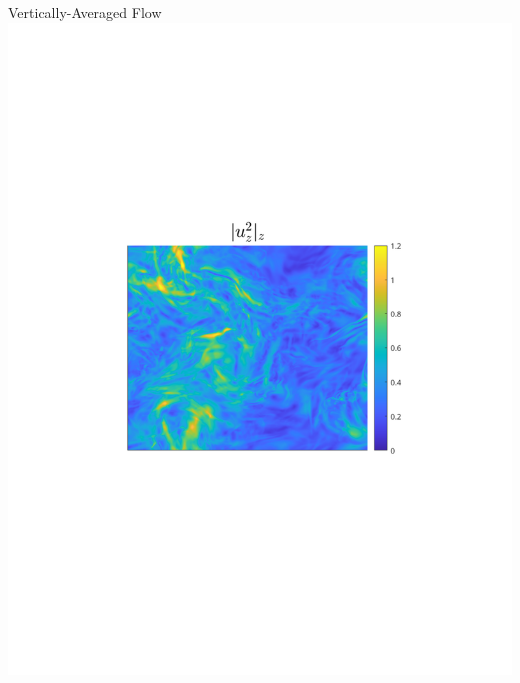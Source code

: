 \documentclass{beamer}
\begin{document}
\begin{frame}{Vertically-Averaged Flow}
        \includegraphics[width=1\textwidth]{images/Om1B30_uzrms_bar.pdf}
    \emp


\end{frame}
\end{document}
